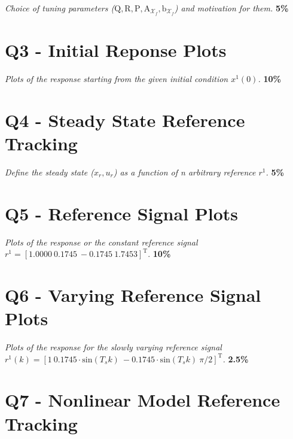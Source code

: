 \documentclass[12pt]{article}
\begin{document}
\begin{center}
    \textit{Choice of tuning parameters ($\mathrm{Q}, \mathrm{R}, \mathrm{P},
    \mathrm{A}_{\mathcal{X}_{f}}, \mathrm{b}_{\mathcal{X}_{f}}$) and motivation for them.} \textbf{5\%}
\end{center}
 
\section{Q3 - Initial Reponse Plots}

\begin{center}
    \textit{Plots of the response starting from the given initial condition $x^1(0)$.} \textbf{10\%}
\end{center}
 
\section{Q4 - Steady State Reference Tracking}

\begin{center}
    \textit{Define the steady state ($x_r, u_r$) as a function of n arbitrary reference $r^1$.} \textbf{5\%}
\end{center}
 
\section{Q5 - Reference Signal Plots}

\begin{center}
    \textit{Plots of the response or the constant reference signal $r^1 = \left[1.0000 \ 0.1745 \
    -0.1745 \ 1.7453 \right]^\mathrm{T}$}. \textbf{10\%}
\end{center}
 
\section{Q6 - Varying Reference Signal Plots}

\begin{center}
    \textit{Plots of the response for the slowly varying reference signal $r^1(k) = \left[1 \
    0.1745 \cdot \mathrm{sin}(T_s k) \ -0.1745 \cdot \mathrm{sin}(T_s k) \ \pi/2 \right]^\mathrm{T}$.} \textbf{2.5\%}
\end{center}

\section{Q7 - Nonlinear Model Reference Tracking}
\end{document}
